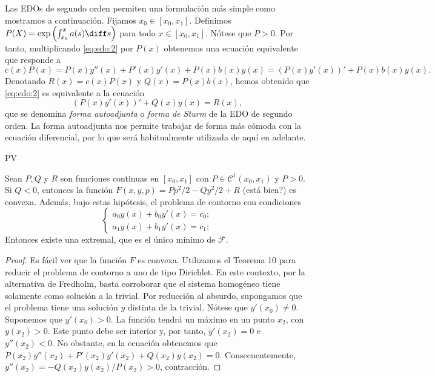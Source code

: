 \documentclass{article}
\begin{document}
Las EDOs de segundo orden permiten una formulación más simple como mostramos a continuación. Fijamos
$x_0 \in [x_0, x_1]$. Definimos $P(X) = \exp\left(\int^x_{x_0} a(s) \diff s\right)$ para todo
$x \in [x_0, x_1]$. Nótese que $P > 0$. Por tanto, multiplicando \eqref{eq:edo:2} por $P(x)$
obtenemos una ecuación equivalente que responde a
\[c(x) P(x) = P(x)y''(x) + P'(x)y'(x) + P(x) b(x) y(x) = \left(P(x)y'(x)\right)' + P(x) b(x) y(x).\]
Denotando $R(x) = c(x) P(x)$ y $Q(x) = P(x) b(x)$, hemos obtenido que \eqref{eq:edo:2} es
equivalente a la ecuación
\begin{equation}
  \label{eq:edo:2}
  \left(P(x)y'(x)\right)' + Q(x) y(x) = R(x),
\end{equation}
que se denomina \emph{forma autoadjunta} o \emph{forma de Sturm} de la EDO de segundo orden. La
forma autoadjunta nos permite trabajar de forma más cómoda con la ecuación diferencial, por lo que
será habitualmente utilizada de aquí en adelante.

\begin{prop}
  PV
\end{prop}

\begin{thm}
  Sean $P, Q$ y $R$ son funciones continuas en $[x_0, x_1]$ con $P \in \mathcal{C}^1(x_0, x_1)$ y
  $P > 0$. Si $Q < 0$, entonces la función $F(x,y,p) = P p^2/2 - Q y^2/2 + R$ (está bien?) es
  convexa. Además, bajo estas hipótesis, el problema de contorno con condiciones
  \begin{equation}
    \begin{cases}
      a_0 y(x) + b_0 y'(x) = c_0; \\
      a_1 y(x) + b_1 y'(x) = c_1;
    \end{cases}
  \end{equation}
  Entonces existe una extremal, que es el único mínimo de $\mathcal{F}$.
\end{thm}
\begin{proof}
  Es fácil ver que la función $F$ es convexa. Utilizamos el Teorema 10 para reducir el problema de
  contorno a uno de tipo Dirichlet. En este contexto, por la alternativa de Fredholm, basta
  corroborar que el sistema homogéneo tiene solamente como solución a la trivial. Por reducción al
  absurdo, supongamos que el problema tiene una solución $y$ distinta de la trivial. Nótese que
  $y'(x_0) \ne 0$. Suponemos que $y'(x_0) > 0$. La función tendrá un máximo en un punto $x_2$, con
  $y(x_2) > 0$. Este punto debe ser interior y, por tanto, $y'(x_2) = 0$ e $y''(x_2) < 0$. No
  obstante, en la ecuación obtenemos que $P(x_2)y''(x_2) + P'(x_2)y'(x_2) + Q(x_2) y(x_2) =
  0$. Consecuentemente, $y''(x_2) = - Q(x_2) y(x_2) / P(x_2) > 0$, contracción.
\end{proof}
\end{document}
